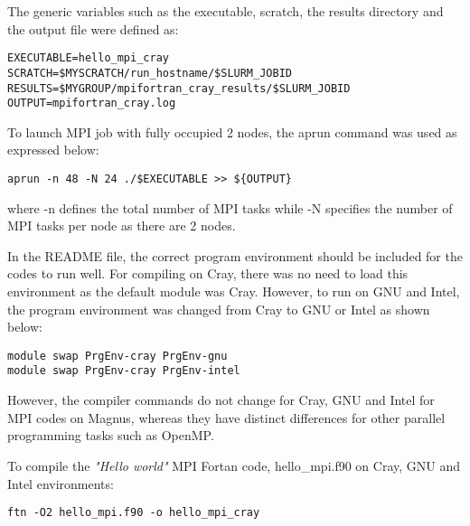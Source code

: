 The generic variables such as the executable, scratch, the results directory and the output file were defined as:

\begin{tcolorbox}
\begin{verbatim}
EXECUTABLE=hello_mpi_cray
SCRATCH=$MYSCRATCH/run_hostname/$SLURM_JOBID
RESULTS=$MYGROUP/mpifortran_cray_results/$SLURM_JOBID
OUTPUT=mpifortran_cray.log 
\end{verbatim}
\end{tcolorbox}


To launch MPI job with fully occupied 2 nodes, the aprun command was used as expressed below:

\begin{strip}
\begin{tcolorbox}
\begin{verbatim}
aprun -n 48 -N 24 ./$EXECUTABLE >> ${OUTPUT}
\end{verbatim}
\end{tcolorbox}
\end{strip}

where -n defines the total number of MPI tasks while -N specifies the number of MPI tasks per node as there are 2 nodes.

In the README file, the correct program environment should be included for the codes to run well. For compiling on Cray, there was no need to load
this environment as the default module was Cray. However, to run on GNU and Intel, the program environment was changed from Cray to GNU or Intel as
shown below:

\begin{tcolorbox}
\begin{verbatim}
module swap PrgEnv-cray PrgEnv-gnu
module swap PrgEnv-cray PrgEnv-intel
\end{verbatim}
\end{tcolorbox}

However, the compiler commands do not change for Cray, GNU and Intel for MPI codes on Magnus, whereas they have distinct differences for other parallel
programming tasks such as OpenMP.

To compile the \emph{"Hello world"} MPI Fortan code, hello\_mpi.f90 on Cray, GNU and Intel environments:

\begin{tcolorbox}
\begin{verbatim}
ftn -O2 hello_mpi.f90 -o hello_mpi_cray
\end{verbatim}
\end{tcolorbox}

